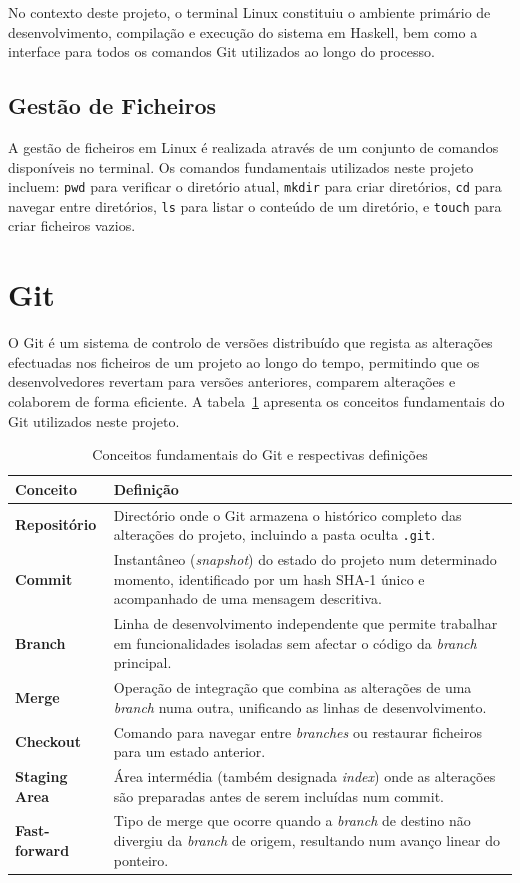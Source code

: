 \documentclass[12pt, a4paper, oneside]{report}
\begin{document}
No contexto deste projeto, o terminal Linux constituiu o ambiente primário de desenvolvimento, compilação e execução do sistema em Haskell, bem como a interface para todos os comandos Git utilizados ao longo do processo.

\subsection{Gestão de Ficheiros}

A gestão de ficheiros em Linux é realizada através de um conjunto de comandos disponíveis no terminal. Os comandos fundamentais utilizados neste projeto incluem: \texttt{pwd} para verificar o diretório atual, \texttt{mkdir} para criar diretórios, \texttt{cd} para navegar entre diretórios, \texttt{ls} para listar o conteúdo de um diretório, e \texttt{touch} para criar ficheiros vazios.

\section{Git}

O Git é um sistema de controlo de versões distribuído que regista as alterações efectuadas nos ficheiros de um projeto ao longo do tempo, permitindo que os desenvolvedores revertam para versões anteriores, comparem alterações e colaborem de forma eficiente. A tabela~\ref{tab:git-concepts} apresenta os conceitos fundamentais do Git utilizados neste projeto.

\begin{table}[H]
\centering
\caption{Conceitos fundamentais do Git e respectivas definições}
\label{tab:git-concepts}
\begin{tabular}{>{\bfseries}p{3cm} p{10cm}}
\toprule
Conceito & Definição \\
\midrule
Repositório & Directório onde o Git armazena o histórico completo das alterações do projeto, incluindo a pasta oculta \texttt{.git}. \\
\addlinespace
Commit & Instantâneo (\textit{snapshot}) do estado do projeto num determinado momento, identificado por um hash SHA-1 único e acompanhado de uma mensagem descritiva. \\
\addlinespace
Branch & Linha de desenvolvimento independente que permite trabalhar em funcionalidades isoladas sem afectar o código da \textit{branch} principal. \\
\addlinespace
Merge & Operação de integração que combina as alterações de uma \textit{branch} numa outra, unificando as linhas de desenvolvimento. \\
\addlinespace
Checkout & Comando para navegar entre \textit{branches} ou restaurar ficheiros para um estado anterior. \\
\addlinespace
Staging Area & Área intermédia (também designada \textit{index}) onde as alterações são preparadas antes de serem incluídas num commit. \\
\addlinespace
Fast-forward & Tipo de merge que ocorre quando a \textit{branch} de destino não divergiu da \textit{branch} de origem, resultando num avanço linear do ponteiro. \\
\bottomrule
\end{tabular}
\end{table}
\end{document}
